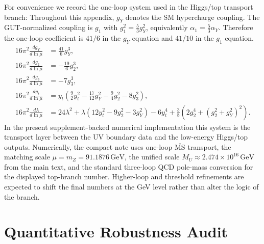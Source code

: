 \documentclass[11pt]{article}
\begin{document}
For convenience we record the one-loop system used in the Higgs/top transport branch:
Throughout this appendix, $g_Y$ denotes the SM hypercharge coupling. The GUT-normalized coupling is $g_1$ with $g_1^2=\frac53 g_Y^2$, equivalently $\alpha_1=\frac53\alpha_Y$. Therefore the one-loop coefficient is $41/6$ in the $g_Y$ equation and $41/10$ in the $g_1$ equation.
\begin{align}
16\pi^2\frac{dg_Y}{d\ln\mu} &= \frac{41}{6}g_Y^3,\\
16\pi^2\frac{dg_2}{d\ln\mu} &= -\frac{19}{6}g_2^3,\\
16\pi^2\frac{dg_3}{d\ln\mu} &= -7g_3^3,\\
16\pi^2\frac{dy_t}{d\ln\mu} &=
y_t\left(\frac92 y_t^2-\frac{17}{12}g_Y^2-\frac94 g_2^2-8g_3^2\right),\\
16\pi^2\frac{d\lambda}{d\ln\mu} &=
24\lambda^2+\lambda\left(12y_t^2-9g_2^2-3g_Y^2\right)-6y_t^4
+\frac38\left(2g_2^4+(g_2^2+g_Y^2)^2\right).
\end{align}
In the present supplement-backed numerical implementation this system is the transport layer between the UV boundary data and the low-energy Higgs/top outputs. Numerically, the compact note uses one-loop $\overline{\mathrm{MS}}$ transport, the matching scale $\mu=m_Z=91.1876\,\mathrm{GeV}$, the unified scale $M_U\approx 2.474\times 10^{16}\,\mathrm{GeV}$ from the main text, and the standard three-loop QCD pole-mass conversion for the displayed top-branch number. Higher-loop and threshold refinements are expected to shift the final numbers at the GeV level rather than alter the logic of the branch.

\section{Quantitative Robustness Audit}\label{app:robustness}
\end{document}
